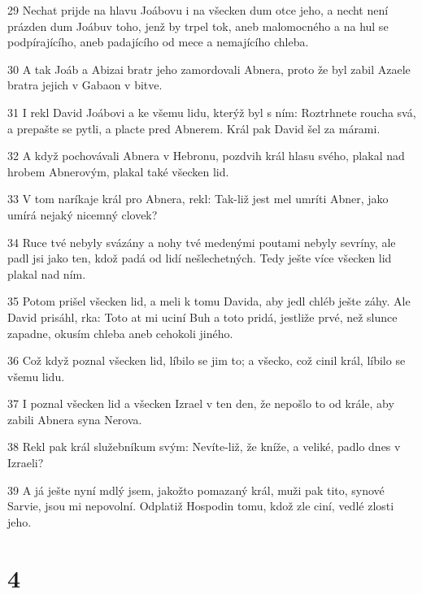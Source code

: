 \par 29 Nechat prijde na hlavu Joábovu i na všecken dum otce jeho, a necht není prázden dum Joábuv toho, jenž by trpel tok, aneb malomocného a na hul se podpírajícího, aneb padajícího od mece a nemajícího chleba.
\par 30 A tak Joáb a Abizai bratr jeho zamordovali Abnera, proto že byl zabil Azaele bratra jejich v Gabaon v bitve.
\par 31 I rekl David Joábovi a ke všemu lidu, kterýž byl s ním: Roztrhnete roucha svá, a prepašte se pytli, a placte pred Abnerem. Král pak David šel za márami.
\par 32 A když pochovávali Abnera v Hebronu, pozdvih král hlasu svého, plakal nad hrobem Abnerovým, plakal také všecken lid.
\par 33 V tom naríkaje král pro Abnera, rekl: Tak-liž jest mel umríti Abner, jako umírá nejaký nicemný clovek?
\par 34 Ruce tvé nebyly svázány a nohy tvé medenými poutami nebyly sevríny, ale padl jsi jako ten, kdož padá od lidí nešlechetných. Tedy ješte více všecken lid plakal nad ním.
\par 35 Potom prišel všecken lid, a meli k tomu Davida, aby jedl chléb ješte záhy. Ale David prisáhl, rka: Toto at mi uciní Buh a toto pridá, jestliže prvé, než slunce zapadne, okusím chleba aneb cehokoli jiného.
\par 36 Což když poznal všecken lid, líbilo se jim to; a všecko, což cinil král, líbilo se všemu lidu.
\par 37 I poznal všecken lid a všecken Izrael v ten den, že nepošlo to od krále, aby zabili Abnera syna Nerova.
\par 38 Rekl pak král služebníkum svým: Nevíte-liž, že kníže, a veliké, padlo dnes v Izraeli?
\par 39 A já ješte nyní mdlý jsem, jakožto pomazaný král, muži pak tito, synové Sarvie, jsou mi nepovolní. Odplatiž Hospodin tomu, kdož zle ciní, vedlé zlosti jeho.

\chapter{4}

